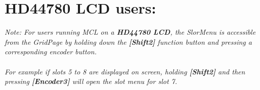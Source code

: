 \section{HD44780 LCD users:}
\textit{Note: For users running MCL on a \textbf{HD44780 LCD}, the SlorMenu  is accessible from the GridPage by holding down the  \textbf{[Shift2]} function button and pressing a corresponding encoder button.\\
\\For example if slots 5 to 8 are displayed on screen, holding  \textbf{[Shift2]} and then pressing \textbf{[Encoder3]} will open the slot menu for slot 7.}

